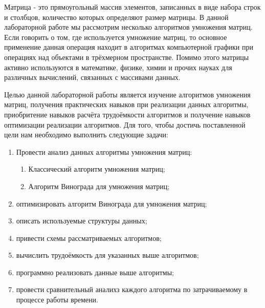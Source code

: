 \Introduction
Матрица - это прямоугольный массив элементов, записанных в виде набора строк и столбцов, количество которых определяют размер матрицы. В данной лабораторной работе мы рассмотрим несколько алгоритмов умножения матриц. Если говорить о том, где используется умножение матриц, то основное применение данная операция находит в алгоритмах компьютерной графики при операциях над объектами в трёхмерном пространстве. Помимо этого матрицы активно используются в математике, физике, химии и прочих науках для различных вычислений, связанных с массивами данных.

Целью данной лабораторной работы является изучение алгоритмов умножения матриц, получения практических навыков при реализации данных алгоритмы, приобритение навыков расчёта трудоёмкости алгоритмов и получение навыков оптимизации реализации алгоритмов. Для того, чтобы достичь поставленной цели нам необходимо выполнить следующие задачи:
\begin{enumerate} 
	\item Провести анализ данных алгоритмы умножения матриц:
		\begin{enumerate} 
			\item Классический алгоритм умножения матриц;
			\item Алгоритм Винограда для умножения матриц;
		\end{enumerate}
	\item оптимизировать алгоритм Винограда для умножения матриц;
	\item описать используемые структуры данных;
	\item привести схемы рассматриваемых алгоритмов;
	\item вычислить трудоёмкость для указанных выше алгоритмов;
	\item программно реализовать данные выше алгоритмы;
	\item провести сравнительный аналихз каждого алгоритма по затрачиваемому в процессе работы времени.
\end{enumerate}